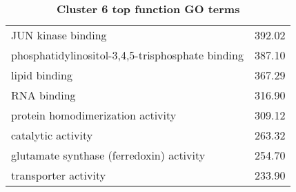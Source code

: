 \begin{table}[hp]
\begin{center}
\begin{tabular}{p{}r}
JUN kinase binding                                            & 392.02                      \\ %
phosphatidylinositol-3,4,5-trisphosphate binding              & 387.10                      \\ %
lipid binding                                                 & 367.29                      \\ 
RNA binding                                                   & 316.90                      \\
protein homodimerization activity                             & 309.12                      \\ %
catalytic activity                                            & 263.32                      \\
glutamate synthase (ferredoxin) activity                      & 254.70                      \\ %
transporter activity                                          & 233.90                      \\ \bottomrule
\end{tabular}
\end{center}

\caption[Cluster 6 top function GO terms]{\sf \textbf{Cluster 6 top function GO terms}}
\label{tab:cls6-function}
\end{table}